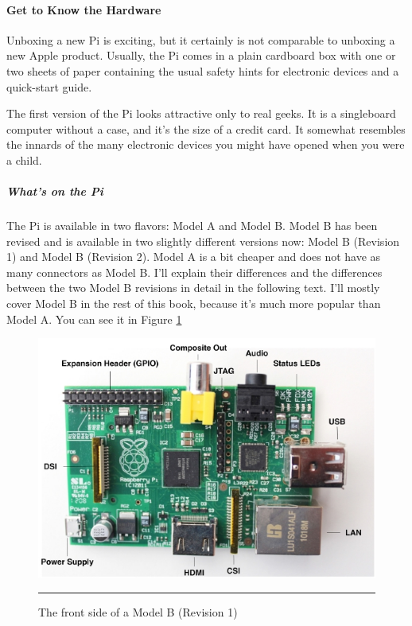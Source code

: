 \paragraph*{Get to Know the Hardware}
\hfill \break
Unboxing a new Pi is exciting, but it certainly is not comparable to unboxing
a new Apple product. Usually, the Pi comes in a plain cardboard box with
one or two sheets of paper containing the usual safety hints for electronic
devices and a quick-start guide.


The first version of the Pi looks attractive only to real geeks. It is a singleboard
computer without a case, and it’s the size of a credit card. It somewhat
resembles the innards of the many electronic devices you might have opened
when you were a child.
\subparagraph*{What’s on the Pi}
\hfill \break
The Pi is available in two flavors: Model A and Model B. Model B has been
revised and is available in two slightly different versions now: Model B (Revision
1) and Model B (Revision 2). Model A is a bit cheaper and does not have
as many connectors as Model B. I’ll explain their differences and the differences
between the two Model B revisions in detail in the following text.
I’ll mostly cover Model B in the rest of this book, because it’s much more
popular than Model A. You can see it in Figure \ref{fig:Raspberry_front}

\begin{figure}[h!]
  \centering
    \includegraphics[width=1\textwidth]{./Pictures/raspberry_pi_b_front.jpg}
  \rule{1\textwidth}{0.5pt}
  \caption{The front side of a Model B (Revision 1)}
  \label{fig:Raspberry_front}
\end{figure}

